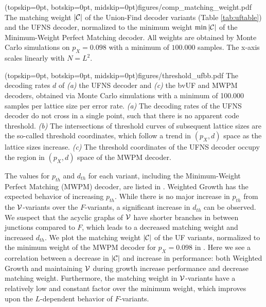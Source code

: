 \Figure[b!](topskip=0pt, botskip=0pt, midskip=0pt){figures/comp_matching_weight.pdf}{
  The matching weight $\lvert\mathcal{C}\rvert$ of the Union-Find decoder variants (Table \ref{tab:uftable}) and the UFNS decoder, normalized to the minimum weight $\min{\lvert\mathcal{C}\rvert}$ of the Minimum-Weight Perfect Matching decoder. All weights are obtained by Monte Carlo simulations on $p_X=0.098$ with a minimum of $100.000$ samples. The x-axis scales linearly with $N = L^2$. \label{comp_weight}}

\Figure[htb](topskip=0pt, botskip=0pt, midskip=0pt){figures/threshold_ufbb.pdf}{
  The decoding rates $d$ of \emph{(a)} the UFNS decoder and \emph{(c)} the bvUF and MWPM decoders, obtained via Monte Carlo simulations with a minimum of 100.000 samples per lattice size per error rate. \emph{(a)} The decoding rates of the UFNS decoder do not cross in a single point, such that there is no apparent code threshold. \emph{(b)} The intersections of threshold curves of subsequent lattice sizes are the so-called threshold coordinates, which follow a trend in $(p_X, d)$ space as the lattice sizes increase. \emph{(c)} The threshold coordinates of the UFNS decoder occupy the region in $(p_X, d)$ space of the MWPM decoder. \label{threshold_ufbb}}

The values for $p_{th}$ and $d_{th}$ for each variant, including the Minimum-Weight Perfect Matching (MWPM) decoder, are listed in . Weighted Growth has the expected behavior of increasing $p_{th}$. While there is no major increase in $p_{th}$ from the $\mathcal{V}$-variants over the $F$-variants, a significant increase in $d_{th}$ can be observed. We suspect that the acyclic graphs of $\mathcal{V}$ have shorter branches in between junctions compared to $F$, which leads to a decreased matching weight and increased $d_{th}$. We plot the matching weight $\lvert\mathcal{C}\rvert$ of the UF variants, normalized to the minimum weight of the MWPM decoder for $p_X = 0.098$ in . Here we see a correlation between a decrease in $\lvert\mathcal{C}\rvert$ and increase in performance: both Weighted Growth and maintaining $\mathcal{V}$ during growth increase performance and decrease matching weight. Furthermore, the matching weight in $\mathcal{V}$-variants have a relatively low and constant factor over the minimum weight, which improves upon the $L$-dependent behavior of $F$-variants.

